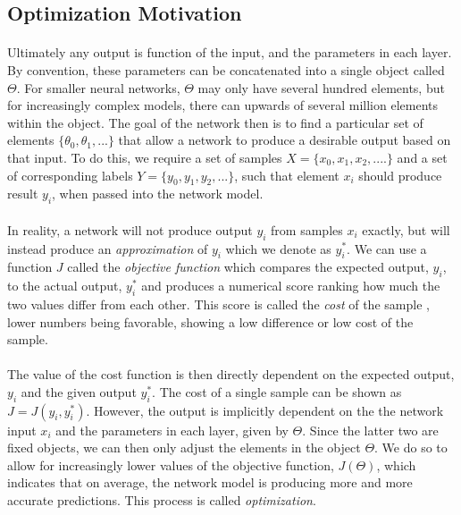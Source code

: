 \documentclass[12pt,letterpaper]{article}
\begin{document}
\subsection{Optimization Motivation}

\paragraph*{}Ultimately any output is function of the input, and the parameters in each layer. By convention, these parameters can be concatenated into a single object called $\Theta$. For smaller neural networks, $\Theta$ may only have several hundred elements, but for increasingly complex models, there can upwards of several million elements within the object. The goal of the network then is to find a particular set of elements $\{ \theta_0 , \theta_1 , ... \}$ that allow a network to produce a desirable output based on that input. To do this, we require a set of samples $X = \{x_0,x_1,x_2,....\}$ and a set of corresponding labels 
$Y = \{y_0,y_1,y_2,...\}$, such that element $x_i$ should produce result $y_i$, when passed into the network model. 

\paragraph*{}In reality, a network will not produce output $y_i$ from samples $x_i$ exactly, but will instead produce an \textit{approximation} of $y_i$ which we denote as $y_i^*$. We can use a function $J$ called the \textit{objective function} which compares the expected output, $y_i$, to the actual output, $y_i^*$ and produces a numerical score ranking how much the two values differ from each other. This score is called the \textit{cost} of the sample \cite{James}, lower numbers being favorable, showing a low difference or low cost of the sample.

\paragraph*{}The value of the cost function is then directly dependent on the expected output, $y_i$ and the given output $y_i^*$. The cost of a single sample can be shown as $J = J( y_i , y_i^* )$. However, the output is implicitly dependent on the the network input $x_i$ and the parameters in each layer, given by $\Theta$. Since the latter two are fixed objects, we can then only adjust the elements in the object $\Theta$. We do so to allow for increasingly lower values of the objective function, $J(\Theta)$, which indicates that on average, the network model is producing more and more accurate predictions. This process is called \textit{optimization}. 
\end{document}
